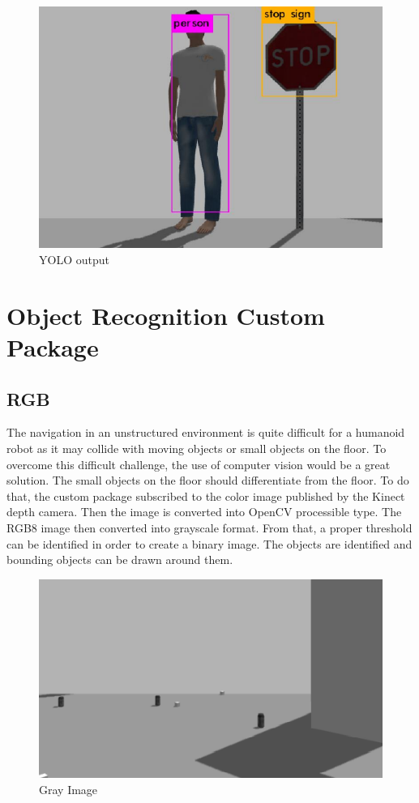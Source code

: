\documentclass[twoside,12pt,times,onecolumn,a4paper]{report}
\begin{document}
\begin{figure}[!h]
  \centering
   \includegraphics[width=12cm]{yolo}
  \caption{YOLO output}
\end{figure}

\section{Object Recognition Custom Package}

\subsection{RGB}

The navigation in an unstructured environment is quite difficult for a humanoid robot 
as it may collide with moving objects or small objects on the floor. To overcome this 
difficult challenge, the use of computer vision would be a great solution. 
The small objects on the floor should differentiate from the floor. To do that, the 
custom package subscribed to the color image published by the Kinect depth camera. 
Then the image is converted into OpenCV processible type. The RGB8 image then 
converted into grayscale format. From that, a proper threshold can be identified in order to 
create a binary image. The objects are identified and bounding objects can be drawn 
around them.

\begin{figure}[!h]
  \centering
   \includegraphics[width=15cm]{gray}
  \caption{Gray Image}
\end{figure}
\end{document}
